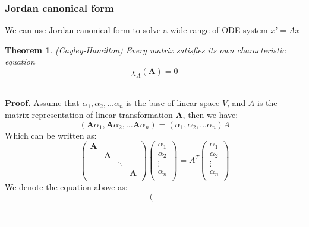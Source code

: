\documentclass[a4paper]{article}
\newtheorem{theorem}{Theorem}
\newenvironment{proof}[1][Proof]{\textbf{#1.} }{\ \rule{0.5em}{0.5em}}
\begin{document}
\subsubsection{Jordan canonical form{\cite{Zhang&Xu}}}
We can use Jordan canonical form to solve a wide range of ODE system $x’=Ax$
\begin{theorem}
(Cayley-Hamilton) Every matrix satisfies its own characteristic equation
\begin{equation}
{{\chi }_{A}}(\mathbf{A})=0
\end{equation}
\end{theorem}
\ \\
\begin{proof}
Assume that ${{\alpha }_{1}},{{\alpha }_{2}},\ldots {{\alpha }_{n}}$ is the base of linear space $V$, and $A$ is the matrix representation of linear transformation $\textbf{A}$, then we have:
\begin{equation}
(\textbf{A}{{\alpha }_{1}},\textbf{A}{{\alpha }_{2}},\ldots \textbf{A}{{\alpha }_{n}})=({{\alpha }_{1}},{{\alpha }_{2}},\ldots {{\alpha }_{n}})A
\end{equation}
Which can be written as:
\begin{equation}
\left( \begin{matrix}
   \textbf{A} & {} & {} & {}  \\
   {} & \textbf{A} & {} & {}  \\
   {} & {} & \ddots  & {}  \\
   {} & {} & {} & \textbf{A}  \\
\end{matrix} \right)\left( \begin{matrix}
   {{\alpha }_{1}}  \\
   {{\alpha }_{2}}  \\
   \vdots   \\
   {{\alpha }_{n}}  \\
\end{matrix} \right)={{A}^{T}}\left( \begin{matrix}
   {{\alpha }_{1}}  \\
   {{\alpha }_{2}}  \\
   \vdots   \\
   {{\alpha }_{n}}  \\
\end{matrix} \right)
\end{equation}
We denote the equation above as:
\begin{equation}
\left( \begin{matrix}

\end{matrix}
\end{equation}
\end{proof}
\end{document}
